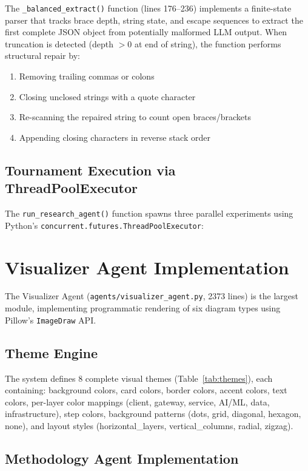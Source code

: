 \documentclass[a4paper,12pt,openany]{report}
\begin{document}
The \texttt{\_balanced\_extract()} function (lines 176--236) implements a finite-state parser that tracks brace depth, string state, and escape sequences to extract the first complete JSON object from potentially malformed LLM output. When truncation is detected (depth $> 0$ at end of string), the function performs structural repair by:
\begin{enumerate}[label=\arabic*., leftmargin=2cm]
\item Removing trailing commas or colons
\item Closing unclosed strings with a quote character
\item Re-scanning the repaired string to count open braces/brackets
\item Appending closing characters in reverse stack order
\end{enumerate}

\subsection{Tournament Execution via ThreadPoolExecutor}

The \texttt{run\_research\_agent()} function spawns three parallel experiments using Python's \texttt{concurrent.futures.ThreadPoolExecutor}:

\section{Visualizer Agent Implementation}

The Visualizer Agent (\texttt{agents/visualizer\_agent.py}, 2373 lines) is the largest module, implementing programmatic rendering of six diagram types using Pillow's \texttt{ImageDraw} API.

\subsection{Theme Engine}

The system defines 8 complete visual themes (Table~\ref{tab:themes}), each containing: background colors, card colors, border colors, accent colors, text colors, per-layer color mappings (client, gateway, service, AI/ML, data, infrastructure), step colors, background patterns (dots, grid, diagonal, hexagon, none), and layout styles (horizontal\_layers, vertical\_columns, radial, zigzag).

\subsection{Methodology Agent Implementation}
\end{document}
